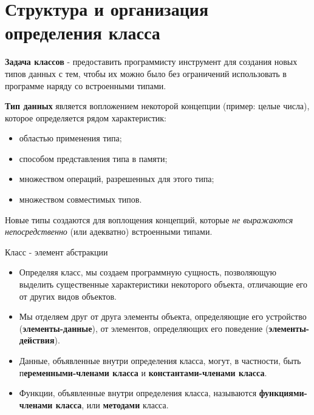 \documentclass{beamer}
\begin{document}
\section{Структура и организация определения класса}
\begin{frame}
\textbf{Задача классов} - предоставить программисту инструмент для создания новых типов данных с тем, чтобы их можно было без ограничений использовать в программе наряду со встроенными типами.

\textbf{Тип данных} является вопложением некоторой концепции (пример: целые числа), которое определяется рядом характеристик:
\begin{itemize}
\item областью применения типа;
\item способом представления типа в памяти;
\item множеством операций, разрешенных для этого типа;
\item множеством совместимых типов.
\end{itemize}
Новые типы создаются для воплощения концепций, которые \textit{не выражаются непосредственно} (или адекватно) встроенными типами.
\end{frame}

\begin{frame}{Класс - элемент абстракции}
\begin{itemize}
\item Определяя класс, мы создаем программную сущность, позволяющую выделить существенные характеристики некоторого объекта, отличающие его от других видов объектов.
\item Мы отделяем друг от друга элементы объекта, определяющие его устройство (\textbf{элементы-данные}), от элементов, определяющих его поведение (\textbf{элементы-действия}).
\item Данные, объявленные внутри определения класса, могут, в частности, быть п\textbf{еременными-членами класса} и \textbf{константами-членами класса}. 
\item Функции, объявленные внутри определения класса, называются \textbf{функциями-членами класса}, или \textbf{методами} класса.
\end{itemize}
\end{frame}
\end{document}
